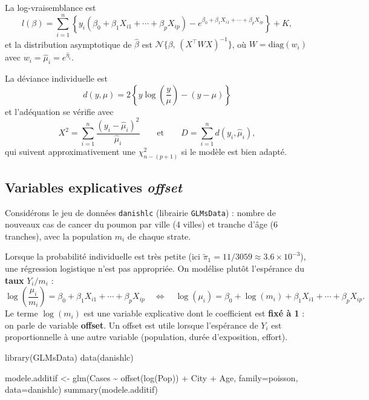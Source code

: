 \documentclass[
  french,
  letterpaper,
  DIV=11,
  numbers=noendperiod]{scrreprt}
\newenvironment{Shaded}{\begin{snugshade}}{\end{snugshade}}
\newcommand{\AttributeTok}[1]{\textcolor[rgb]{0.40,0.45,0.13}{#1}}
\newcommand{\FunctionTok}[1]{\textcolor[rgb]{0.28,0.35,0.67}{#1}}
\newcommand{\NormalTok}[1]{\textcolor[rgb]{0.00,0.23,0.31}{#1}}
\newcommand{\OtherTok}[1]{\textcolor[rgb]{0.00,0.23,0.31}{#1}}
\newcommand{\SpecialCharTok}[1]{\textcolor[rgb]{0.37,0.37,0.37}{#1}}
\begin{document}
La log-vraisemblance est
\[l(\beta) = \sum_{i=1}^n\left\{y_i(\beta_0 + \beta_1 X_{i1} + \cdots + \beta_p X_{ip}) - e^{\beta_0 + \beta_1 X_{i1} + \cdots + \beta_p X_{ip}}\right\} + K,\]
et la distribution asymptotique de \(\hat\beta\) est
\(\mathcal{N}\{\beta,\,(X^\top WX)^{-1}\}\), où
\(W = \mathrm{diag}(w_i)\) avec \(w_i = \hat\mu_i = e^{\hat\eta_i}\).

La déviance individuelle est
\[d(y,\mu) = 2\left\{y\log\!\left(\frac{y}{\mu}\right) - (y - \mu)\right\}\]
et l'adéquation se vérifie avec
\[X^2 = \sum_{i=1}^n\frac{(y_i - \hat\mu_i)^2}{\hat\mu_i} \qquad\mbox{et}\qquad D = \sum_{i=1}^n d(y_i,\hat\mu_i),\]
qui suivent approximativement une \(\chi^2_{n-(p+1)}\) si le modèle est
bien adapté.

\subsection{\texorpdfstring{Variables explicatives
\emph{offset}}{Variables explicatives offset}}\label{variables-explicatives-offset}

Considérons le jeu de données \texttt{danishlc} (librairie
\texttt{GLMsData}) : nombre de nouveaux cas de cancer du poumon par
ville (4 villes) et tranche d'âge (6 tranches), avec la population
\(m_i\) de chaque strate.

Lorsque la probabilité individuelle est très petite (ici
\(\tilde\pi_1 = 11/3059 \approx 3.6\times10^{-3}\)), une régression
logistique n'est pas appropriée. On modélise plutôt l'espérance du
\textbf{taux} \(Y_i/m_i\) :
\[\log\!\left(\frac{\mu_i}{m_i}\right) = \beta_0 + \beta_1 X_{i1} + \cdots + \beta_p X_{ip}
\quad\Longleftrightarrow\quad
\log(\mu_i) = \beta_0 + \log(m_i) + \beta_1 X_{i1} + \cdots + \beta_p X_{ip}.\]
Le terme \(\log(m_i)\) est une variable explicative dont le coefficient
est \textbf{fixé à 1} : on parle de variable \textbf{offset}. Un offset
est utile lorsque l'espérance de \(Y_i\) est proportionnelle à une autre
variable (population, durée d'exposition, effort).

\begin{Shaded}
\begin{Highlighting}[]
\FunctionTok{library}\NormalTok{(GLMsData)}
\FunctionTok{data}\NormalTok{(danishlc)}

\NormalTok{modele.additif }\OtherTok{\textless{}{-}} \FunctionTok{glm}\NormalTok{(Cases }\SpecialCharTok{\textasciitilde{}} \FunctionTok{offset}\NormalTok{(}\FunctionTok{log}\NormalTok{(Pop)) }\SpecialCharTok{+}\NormalTok{ City }\SpecialCharTok{+}\NormalTok{ Age,}
                      \AttributeTok{family=}\NormalTok{poisson, }\AttributeTok{data=}\NormalTok{danishlc)}
\FunctionTok{summary}\NormalTok{(modele.additif)}
\end{Highlighting}
\end{Shaded}
\end{document}
